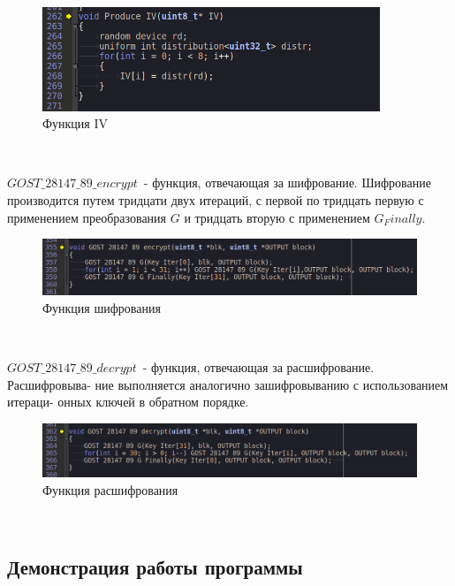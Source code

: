 \documentclass[oneside,final,14pt]{extreport}
\begin{document}
\begin{figure}[h!]
\includegraphics[width=0.9\textwidth]{16.png}
\caption{Функция IV}
\end{figure}





~\


$GOST\_28147\_89\_encrypt$~- функция, отвечающая за шифрование. Шифрование производится путем тридцати двух итераций, с первой по
тридцать первую с применением преобразования $G$ и тридцать вторую с
применением $G_Finally$.\\

\begin{figure}[h!]
\includegraphics[width=1.1\textwidth]{17.png}
\caption{Функция шифрования}
\end{figure}




~\



$GOST\_28147\_89\_decrypt$~- функция, отвечающая за расшифрование. Расшифровыва-
ние выполняется аналогично зашифровыванию с использованием итераци-
онных ключей в обратном порядке.\\

\begin{figure}[h!]
\includegraphics[width=1.1\textwidth]{18.png}
\caption{Функция расшифрования}
\end{figure}




~\



\subsection{Демонстрация работы программы}
\end{document}
